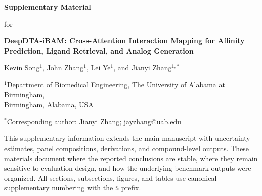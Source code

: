 \documentclass[11pt]{article}
\begin{document}
\onehalfspacing

\begin{center}
{\Large\bfseries Supplementary Material\par}
\vspace{0.6\baselineskip}
{\normalsize for\par}
\vspace{0.4\baselineskip}
{\large\bfseries DeepDTA-iBAM: Cross-Attention Interaction Mapping for Affinity Prediction, Ligand Retrieval, and Analog Generation\par}
\vspace{0.9\baselineskip}
{\normalsize Kevin Song$^{1}$, John Zhang$^{1}$, Lei Ye$^{1}$, and Jianyi Zhang$^{1,*}$\par}
\vspace{0.5\baselineskip}
{\small $^{1}$Department of Biomedical Engineering, The University of Alabama at Birmingham,\\ Birmingham, Alabama, USA\par}
\vspace{0.3\baselineskip}
{\small $^{*}$Corresponding author: Jianyi Zhang; \href{mailto:jayzhang@uab.edu}{jayzhang@uab.edu}\par}
\end{center}

\vspace{1.0\baselineskip}

This supplementary information extends the main manuscript with uncertainty estimates, panel compositions, derivations, and compound-level outputs. These materials document where the reported conclusions are stable, where they remain sensitive to evaluation design, and how the underlying benchmark outputs were organized. All sections, subsections, figures, and tables use canonical supplementary numbering with the \texttt{S} prefix.
\end{document}
